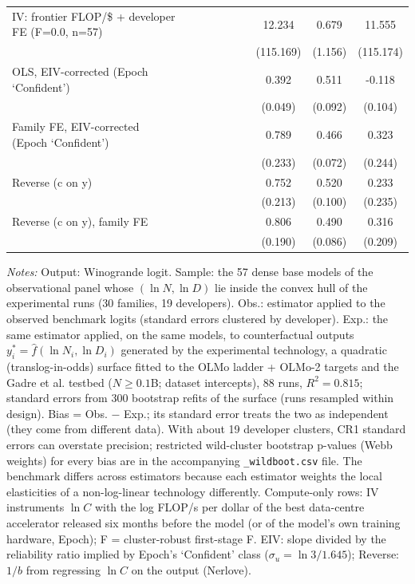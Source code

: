 \begin{table}[!htbp]
\begin{threeparttable}
\begin{tabular}{lccccccccc}
IV: frontier FLOP/\$ + developer FE (F=0.0, n=57) &  &  &  &  &  &  & 12.234 & 0.679 & 11.555 \\
 &  &  &  &  &  &  & (115.169) & (1.156) & (115.174) \\
OLS, EIV-corrected (Epoch `Confident') &  &  &  &  &  &  & 0.392 & 0.511 & -0.118 \\
 &  &  &  &  &  &  & (0.049) & (0.092) & (0.104) \\
Family FE, EIV-corrected (Epoch `Confident') &  &  &  &  &  &  & 0.789 & 0.466 & 0.323 \\
 &  &  &  &  &  &  & (0.233) & (0.072) & (0.244) \\
Reverse (c on y) &  &  &  &  &  &  & 0.752 & 0.520 & 0.233 \\
 &  &  &  &  &  &  & (0.213) & (0.100) & (0.235) \\
Reverse (c on y), family FE &  &  &  &  &  &  & 0.806 & 0.490 & 0.316 \\
 &  &  &  &  &  &  & (0.190) & (0.086) & (0.209) \\
\bottomrule
\end{tabular}
\begin{tablenotes}[flushleft]
\footnotesize
\item \textit{Notes:} Output: Winogrande logit. Sample: the 57 dense base models of the observational panel whose $(\ln N,\ln D)$ lie inside the convex hull of the experimental runs (30 families, 19 developers). Obs.: estimator applied to the observed benchmark logits (standard errors clustered by developer). Exp.: the same estimator applied, on the same models, to counterfactual outputs $y^*_i=\hat f(\ln N_i,\ln D_i)$ generated by the experimental technology, a quadratic (translog-in-odds) surface fitted to the OLMo ladder + OLMo-2 targets and the Gadre et al. testbed ($N\geq0.1$B; dataset intercepts), 88 runs, $R^2=0.815$; standard errors from 300 bootstrap refits of the surface (runs resampled within design). Bias = Obs. $-$ Exp.; its standard error treats the two as independent (they come from different data). With about 19 developer clusters, CR1 standard errors can overstate precision; restricted wild-cluster bootstrap p-values (Webb weights) for every bias are in the accompanying \texttt{\_wildboot.csv} file. The benchmark differs across estimators because each estimator weights the local elasticities of a non-log-linear technology differently. Compute-only rows: IV instruments $\ln C$ with the log FLOP/s per dollar of the best data-centre accelerator released six months before the model (or of the model's own training hardware, Epoch); F = cluster-robust first-stage F. EIV: slope divided by the reliability ratio implied by Epoch's `Confident' class ($\sigma_u=\ln 3/1.645$); Reverse: $1/b$ from regressing $\ln C$ on the output (Nerlove).
\end{tablenotes}
\end{threeparttable}
\end{table}
